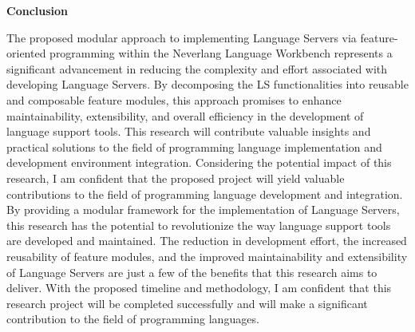 \hfill \break
\noindent
\textbf{Conclusion}

The proposed modular approach to implementing Language Servers via feature-oriented programming within the Neverlang Language Workbench represents a significant advancement in reducing the complexity and effort associated with developing Language Servers. By decomposing the LS functionalities into reusable and composable feature modules, this approach promises to enhance maintainability, extensibility, and overall efficiency in the development of language support tools. This research will contribute valuable insights and practical solutions to the field of programming language implementation and development environment integration.
Considering the potential impact of this research, I am confident that the proposed project will yield valuable contributions to the field of programming language development and integration. By providing a modular framework for the implementation of Language Servers, this research has the potential to revolutionize the way language support tools are developed and maintained. The reduction in development effort, the increased reusability of feature modules, and the improved maintainability and extensibility of Language Servers are just a few of the benefits that this research aims to deliver. With the proposed timeline and methodology, I am confident that this research project will be completed successfully and will make a significant contribution to the field of programming languages.
